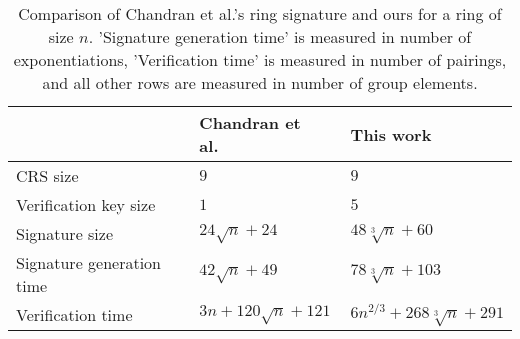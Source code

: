 \begin{table}[h]
\begin{center}
\begin{minipage}{\textwidth}
\begin{center}
\begin{tabular}{|l|l|l|}
\hline
                                           & Chandran et al.~\cite{ICALP:ChaGroSah07} & This work \\
\hline\hline
\rule{0pt}{2.5ex}CRS size                  & $9$                                       & $9$       \\ 
\rule{0pt}{2.5ex}Verification key size     & $1$                                       & $5$       \\
\rule{0pt}{2.5ex}Signature size            & $24 \sqrt{n} + 24$                        & $48 \sqrt[3]{n} + 60$\\    
\rule{0pt}{2.5ex}Signature generation time & $42 \sqrt{n} + 49$                        & $78 \sqrt[3]{n} + 103$\\
\rule{0pt}{2.5ex}Verification time         & $3 n + 120 \sqrt{n} + 121$                & $6 n^{2/3} + 268 \sqrt[3]{n} + 291$\\
\hline 
\end{tabular}
\end{center}
\caption{Comparison of Chandran et al.'s ring signature and ours for a ring of size $n$. 'Signature generation time' is measured in number of exponentiations, 'Verification time' is measured in number of pairings, and all other rows are measured in number of group elements.\label{table:eff}}
\end{minipage}
\end{center}
\end{table}
